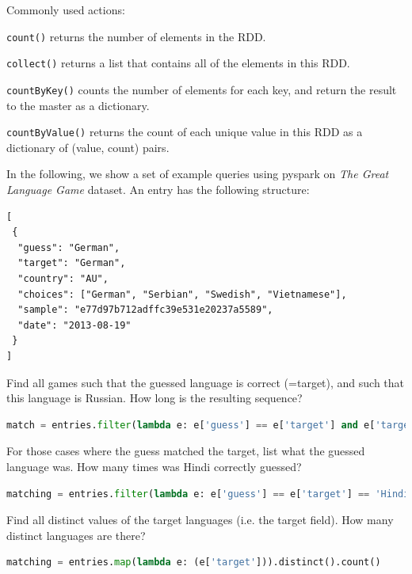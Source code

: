 \documentclass[11pt,oneside,a4paper]{article}
\begin{document}
Commonly used actions:

\begin{compactitem}
\item \texttt{count()} returns the number of elements in the RDD.
\item \texttt{collect()} returns a list that contains all of the elements in this RDD.
\item \texttt{countByKey()} counts the number of elements for each key, and return the result to the master as a dictionary.
\item \texttt{countByValue()} returns the count of each unique value in this RDD as a dictionary of (value, count) pairs.
\end{compactitem}



In the following, we show a set of example queries using pyspark on \textit{The Great Language Game} dataset. An entry has the following structure:

\begin{lstlisting}[basicstyle=\small,columns=flexible]
[
 {
  "guess": "German",
  "target": "German",
  "country": "AU",
  "choices": ["German", "Serbian", "Swedish", "Vietnamese"],
  "sample": "e77d97b712adffc39e531e20237a5589",
  "date": "2013-08-19"
 }
]
\end{lstlisting}

Find all games such that the guessed language is correct (=target), and such that this language is Russian. How long is the resulting sequence?

\begin{lstlisting}[language=Python,basicstyle=\small,columns=flexible]
match = entries.filter(lambda e: e['guess'] == e['target'] and e['target'] == 'Russian').count()
\end{lstlisting}



For those cases where the guess matched the target, list what the guessed language was.  How many times was Hindi correctly guessed?

\begin{lstlisting}[language=Python,basicstyle=\small,columns=flexible]
matching = entries.filter(lambda e: e['guess'] == e['target'] == 'Hindi').count()
\end{lstlisting}

Find all distinct values of the target languages (i.e. the target field). How many distinct languages are there?

\begin{lstlisting}[language=Python,basicstyle=\small,columns=flexible]
matching = entries.map(lambda e: (e['target'])).distinct().count()
\end{lstlisting}
\end{document}
